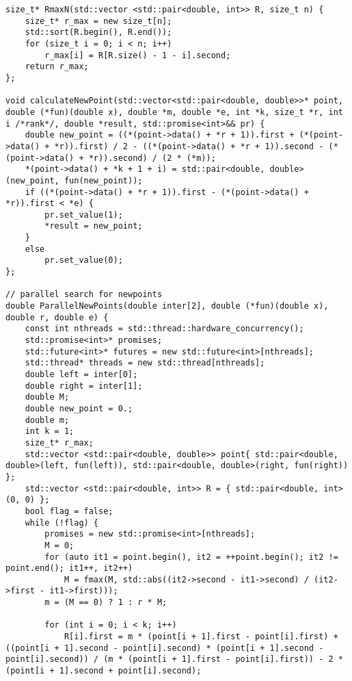 \documentclass{report}
\begin{document}
\begin{lstlisting}
size_t* RmaxN(std::vector <std::pair<double, int>> R, size_t n) {
    size_t* r_max = new size_t[n];
    std::sort(R.begin(), R.end());
    for (size_t i = 0; i < n; i++)
        r_max[i] = R[R.size() - 1 - i].second;
    return r_max;
};

void calculateNewPoint(std::vector<std::pair<double, double>>* point, double (*fun)(double x), double *m, double *e, int *k, size_t *r, int i /*rank*/, double *result, std::promise<int>&& pr) {
    double new_point = ((*(point->data() + *r + 1)).first + (*(point->data() + *r)).first) / 2 - ((*(point->data() + *r + 1)).second - (*(point->data() + *r)).second) / (2 * (*m));
    *(point->data() + *k + 1 + i) = std::pair<double, double>(new_point, fun(new_point));
    if ((*(point->data() + *r + 1)).first - (*(point->data() + *r)).first < *e) {
        pr.set_value(1);
        *result = new_point;
    }
    else
        pr.set_value(0);
};

// parallel search for newpoints
double ParallelNewPoints(double inter[2], double (*fun)(double x), double r, double e) {
    const int nthreads = std::thread::hardware_concurrency();
    std::promise<int>* promises;
    std::future<int>* futures = new std::future<int>[nthreads];
    std::thread* threads = new std::thread[nthreads];
    double left = inter[0];
    double right = inter[1];
    double M;
    double new_point = 0.;
    double m;
    int k = 1;
    size_t* r_max;
    std::vector <std::pair<double, double>> point{ std::pair<double, double>(left, fun(left)), std::pair<double, double>(right, fun(right)) };
    std::vector <std::pair<double, int>> R = { std::pair<double, int>(0, 0) };
    bool flag = false;
    while (!flag) {
        promises = new std::promise<int>[nthreads];
        M = 0;
        for (auto it1 = point.begin(), it2 = ++point.begin(); it2 != point.end(); it1++, it2++)
            M = fmax(M, std::abs((it2->second - it1->second) / (it2->first - it1->first)));
        m = (M == 0) ? 1 : r * M;

        for (int i = 0; i < k; i++)
            R[i].first = m * (point[i + 1].first - point[i].first) + ((point[i + 1].second - point[i].second) * (point[i + 1].second - point[i].second)) / (m * (point[i + 1].first - point[i].first)) - 2 * (point[i + 1].second + point[i].second);


\end{lstlisting}
\end{document}
